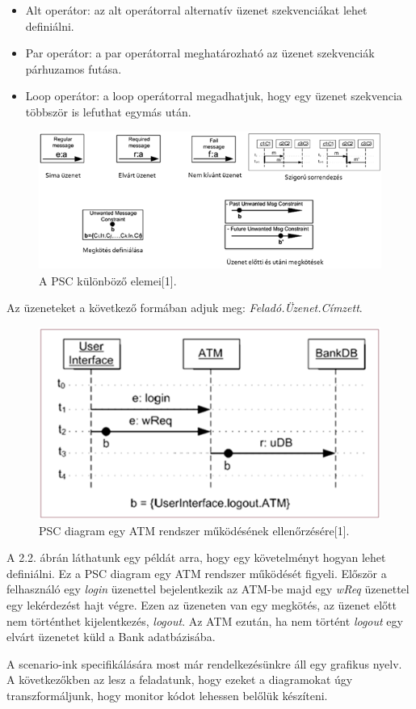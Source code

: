 \begin{itemize}
    \item Alt operátor: az alt operátorral alternatív üzenet szekvenciákat lehet definiálni.
    \item Par operátor: a par operátorral meghatározható az üzenet szekvenciák párhuzamos futása.
    \item Loop operátor: a loop operátorral megadhatjuk, hogy egy üzenet szekvencia többször is lefuthat egymás után.
\end{itemize}

\begin{figure}[!ht]
    \centering
    \includegraphics[width=150mm, keepaspectratio]{figures/2abra.png}
    \caption{A PSC különböző elemei[1].}
\end{figure}

Az üzeneteket a következő formában adjuk meg: \textit{Feladó.Üzenet.Címzett}.

\begin{figure}[!ht]
    \centering
    \includegraphics[width=130mm, keepaspectratio]{figures/3abra.png}
    \caption{PSC diagram egy ATM rendszer működésének ellenőrzésére[1].}
\end{figure}
A 2.2. ábrán láthatunk egy példát arra, hogy egy követelményt hogyan lehet definiálni.
Ez a PSC diagram egy ATM rendszer működését figyeli.
Először a felhasználó egy \textit{login} üzenettel bejelentkezik az ATM-be majd egy \textit{wReq} üzenettel egy lekérdezést hajt végre.
Ezen az üzeneten van egy megkötés, az üzenet előtt nem történthet kijelentkezés, \textit{logout}.
Az ATM ezután, ha nem történt \textit{logout} egy elvárt üzenetet küld a Bank adatbázisába.

A scenario-ink specifikálására most már rendelkezésünkre áll egy grafikus nyelv.
A következőkben az lesz a feladatunk, hogy ezeket a diagramokat úgy transzformáljunk, hogy monitor kódot lehessen belőlük készíteni.
